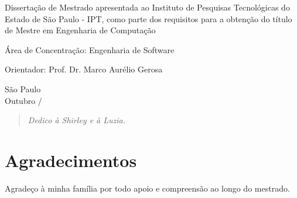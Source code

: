 \documentclass[12pt,twoside,a4paper]{book} %
\begin{document}
    \vskip 2cm

    \hspace{6cm}\begin{minipage}{0.48\linewidth}
	Dissertação de Mestrado apresentada
	ao Instituto de Pesquisas Tecnológicas do\\
	Estado de São Paulo - IPT, como 
	parte dos requisitos para a obtenção do 
	título de Mestre em Engenharia de 
	Computação
    \end{minipage}
    
    \vskip 2cm
    
    \hspace{6cm}\begin{minipage}{0.48\linewidth}
	Área de Concentração: Engenharia de Software
    \end{minipage}
    
    \vskip 2cm
    
    \hspace{6cm}\begin{minipage}{0.48\linewidth}
	Orientador: Prof. Dr. Marco Aurélio Gerosa
    \end{minipage}
    
    \vskip 6cm
    
    \begin{center}
        São Paulo\\
        
        Outubro / \the\year
    \end{center}

\pagebreak



\newpage
\thispagestyle{empty}

\begin{center}
        \vspace*{18 cm}
        \begin{quote}
            \begin{flushright}
            \textit{Dedico à Shirley e à Luzia.}
            \end{flushright}
        \end{quote}
    \end{center}


\pagebreak


\chapter*{Agradecimentos}
Agradeço à minha família por todo apoio e compreensão ao longo do mestrado.
\\
\end{document}
